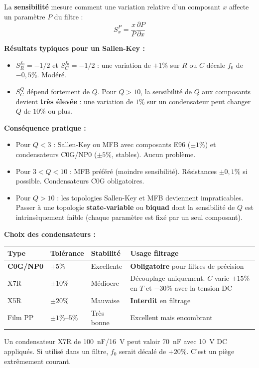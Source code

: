 \documentclass[12pt,a4paper,twoside]{book}
\begin{document}
\begin{formule}
La \textbf{sensibilité} mesure comment une variation relative d'un composant $x$ affecte un paramètre $P$ du filtre :
\[
S_x^P = \frac{x}{P}\frac{\partial P}{\partial x}
\]

\textbf{Résultats typiques pour un Sallen-Key :}
\begin{itemize}[nosep]
\item $S_R^{f_0} = -1/2$ et $S_C^{f_0} = -1/2$ : une variation de $+1\%$ sur $R$ ou $C$ décale $f_0$ de $-0{,}5\%$. Modéré.
\item $S_C^Q$ dépend fortement de $Q$. Pour $Q > 10$, la sensibilité de $Q$ aux composants devient \textbf{très élevée} : une variation de $1\%$ sur un condensateur peut changer $Q$ de $10\%$ ou plus.
\end{itemize}
\end{formule}

\begin{attention}
\textbf{Conséquence pratique :}
\begin{itemize}[nosep]
\item Pour $Q < 3$ : Sallen-Key ou MFB avec composants E96 ($\pm 1\%$) et condensateurs C0G/NP0 ($\pm 5\%$, stables). Aucun problème.
\item Pour $3 < Q < 10$ : MFB préféré (moindre sensibilité). Résistances $\pm 0{,}1\%$ si possible. Condensateurs C0G obligatoires.
\item Pour $Q > 10$ : les topologies Sallen-Key et MFB deviennent impraticables. Passer à une topologie \textbf{state-variable} ou \textbf{biquad} dont la sensibilité de $Q$ est intrinsèquement faible (chaque paramètre est fixé par un seul composant).
\end{itemize}
\end{attention}

\begin{pratique}
\textbf{Choix des condensateurs :}
\begin{center}
\renewcommand{\arraystretch}{1.3}
\begin{tabular}{p{2.5cm}p{2cm}p{2.5cm}p{5.5cm}}
\toprule
\textbf{Type} & \textbf{Tolérance} & \textbf{Stabilité} & \textbf{Usage filtrage} \\
\midrule
\textbf{C0G/NP0} & $\pm 5\%$ & Excellente & \textbf{Obligatoire} pour filtres de précision \\
X7R & $\pm 10\%$ & Médiocre & Découplage uniquement. $C$ varie $\pm 15\%$ en $T$ et $-30\%$ avec la tension DC \\
X5R & $\pm 20\%$ & Mauvaise & \textbf{Interdit} en filtrage \\
Film PP & $\pm 1\%$--$5\%$ & Très bonne & Excellent mais encombrant \\
\bottomrule
\end{tabular}
\end{center}

Un condensateur X7R de \SI{100}{nF}/\SI{16}{V} peut valoir \SI{70}{nF} avec \SI{10}{V} DC appliqués. Si utilisé dans un filtre, $f_0$ serait décalé de $+20\%$. C'est un piège extrêmement courant.
\end{pratique}
\end{document}
